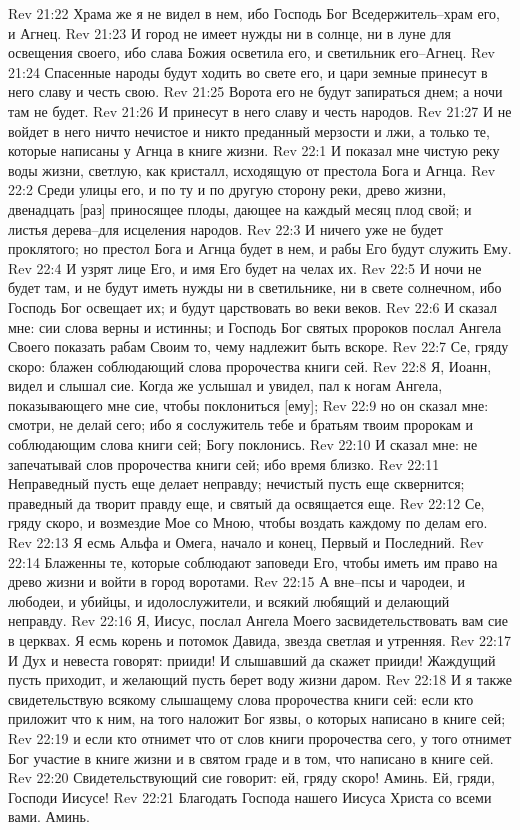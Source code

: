 Rev 21:22  Храма же я не видел в нем, ибо Господь Бог Вседержитель--храм его, и Агнец.
Rev 21:23  И город не имеет нужды ни в солнце, ни в луне для освещения своего, ибо слава Божия осветила его, и светильник его--Агнец.
Rev 21:24  Спасенные народы будут ходить во свете его, и цари земные принесут в него славу и честь свою.
Rev 21:25  Ворота его не будут запираться днем; а ночи там не будет.
Rev 21:26  И принесут в него славу и честь народов.
Rev 21:27  И не войдет в него ничто нечистое и никто преданный мерзости и лжи, а только те, которые написаны у Агнца в книге жизни.
Rev 22:1  И показал мне чистую реку воды жизни, светлую, как кристалл, исходящую от престола Бога и Агнца.
Rev 22:2  Среди улицы его, и по ту и по другую сторону реки, древо жизни, двенадцать [раз] приносящее плоды, дающее на каждый месяц плод свой; и листья дерева--для исцеления народов.
Rev 22:3  И ничего уже не будет проклятого; но престол Бога и Агнца будет в нем, и рабы Его будут служить Ему.
Rev 22:4  И узрят лице Его, и имя Его будет на челах их.
Rev 22:5  И ночи не будет там, и не будут иметь нужды ни в светильнике, ни в свете солнечном, ибо Господь Бог освещает их; и будут царствовать во веки веков.
Rev 22:6  И сказал мне: сии слова верны и истинны; и Господь Бог святых пророков послал Ангела Своего показать рабам Своим то, чему надлежит быть вскоре.
Rev 22:7  Се, гряду скоро: блажен соблюдающий слова пророчества книги сей.
Rev 22:8  Я, Иоанн, видел и слышал сие. Когда же услышал и увидел, пал к ногам Ангела, показывающего мне сие, чтобы поклониться [ему];
Rev 22:9  но он сказал мне: смотри, не делай сего; ибо я сослужитель тебе и братьям твоим пророкам и соблюдающим слова книги сей; Богу поклонись.
Rev 22:10  И сказал мне: не запечатывай слов пророчества книги сей; ибо время близко.
Rev 22:11  Неправедный пусть еще делает неправду; нечистый пусть еще сквернится; праведный да творит правду еще, и святый да освящается еще.
Rev 22:12  Се, гряду скоро, и возмездие Мое со Мною, чтобы воздать каждому по делам его.
Rev 22:13  Я есмь Альфа и Омега, начало и конец, Первый и Последний.
Rev 22:14  Блаженны те, которые соблюдают заповеди Его, чтобы иметь им право на древо жизни и войти в город воротами.
Rev 22:15  А вне--псы и чародеи, и любодеи, и убийцы, и идолослужители, и всякий любящий и делающий неправду.
Rev 22:16  Я, Иисус, послал Ангела Моего засвидетельствовать вам сие в церквах. Я есмь корень и потомок Давида, звезда светлая и утренняя.
Rev 22:17  И Дух и невеста говорят: прииди! И слышавший да скажет прииди! Жаждущий пусть приходит, и желающий пусть берет воду жизни даром.
Rev 22:18  И я также свидетельствую всякому слышащему слова пророчества книги сей: если кто приложит что к ним, на того наложит Бог язвы, о которых написано в книге сей;
Rev 22:19  и если кто отнимет что от слов книги пророчества сего, у того отнимет Бог участие в книге жизни и в святом граде и в том, что написано в книге сей.
Rev 22:20  Свидетельствующий сие говорит: ей, гряду скоро! Аминь. Ей, гряди, Господи Иисусе!
Rev 22:21  Благодать Господа нашего Иисуса Христа со всеми вами. Аминь.


